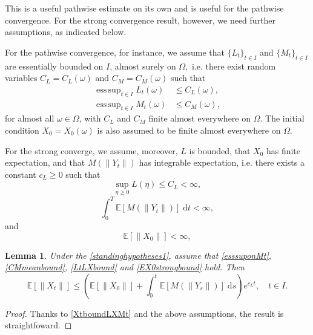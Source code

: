 \documentclass[reqno,12pt]{amsart}
\theoremstyle{plain} %
\newtheorem{lemma}{Lemma}[section]
\theoremstyle{definition} %
\begin{document}
This is a useful pathwise estimate on its own and is useful for the pathwise convergence. For the strong convergence result, however, we need further assumptions, as indicated below.

For the pathwise convergence, for instance, we assume that $\{L_t\}_{t\in I}$ and $\{M_t\}_{t\in I}$ are essentially bounded on $I$, almost surely on $\Omega,$ i.e. there exist random variables $C_L=C_L(\omega)$ and $C_M=C_M(\omega)$ such that
\begin{align}
    \label{esssuponLt}
    \operatorname{ess\,sup}_{t\in I} L_t(\omega) & \leq C_L(\omega), \\
    \label{esssuponMt}
    \operatorname{ess\,sup}_{t\in I} M_t(\omega) & \leq C_M(\omega),
\end{align}
for almost all $\omega\in\Omega$, with $C_L$ and $C_M$ finite almost everywhere on $\Omega.$ The initial condition $X_0=X_0(\omega)$ is also assumed to be finite almost everywhere on $\Omega.$

For the strong converge, we assume, moreover, $L$ is bounded, that $X_0$ has finite expectation, and that $M(\|Y_t\|)$ has integrable expectation, i.e. there exists a constant $c_L \geq 0$ such that
\begin{equation}
    \label{LtLXbound}
    \sup_{\eta \geq 0} L(\eta) \leq C_L < \infty,
\end{equation}
\begin{equation}
    \label{CMmeanbound}
    \int_0^T \mathbb{E}\left[M(\|Y_t\|)\right] \;\mathrm{d}t < \infty,
\end{equation}
and
\begin{equation}
    \label{EX0strongbound}
    \mathbb{E}[\|X_0\|] < \infty,
\end{equation}

\begin{lemma}
    \label{lemstrongbound}
    Under the \cref{standinghypotheses1}, assume that \eqref{esssuponMt}, \eqref{CMmeanbound}, \eqref{LtLXbound} and \eqref{EX0strongbound} hold. Then
    \begin{equation}
        \label{EXtstrongbound}
        \mathbb{E}[\|X_t\|] \leq \left(\mathbb{E}[\|X_0\|] + \int_0^t \mathbb{E}[M(\|Y_s\|)]\;\mathrm{d}s\right) e^{c_L t}, \quad t\in I.
    \end{equation}
\end{lemma}

\begin{proof}
    Thanks to \eqref{XtboundLXMt} and the above assumptions, the result is straightfoward.
\end{proof}
\end{document}
